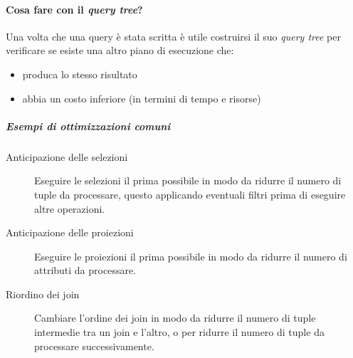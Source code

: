     \paragraph{Cosa fare con il \textit{query tree}?} Una volta che una query è stata scritta è utile costruirsi il suo \textit{query tree} per verificare se esiste una altro piano di esecuzione che: 
        \begin{itemize}
            \item produca lo stesso risultato
            \item abbia un costo inferiore (in termini di tempo e risorse)
        \end{itemize}
        \subparagraph{Esempi di ottimizzazioni comuni}
        \begin{description}
            \item[Anticipazione delle selezioni] Eseguire le selezioni il prima possibile in modo da ridurre il numero di tuple da processare, questo applicando eventuali filtri prima di eseguire altre operazioni.
            \item[Anticipazione delle proiezioni] Eseguire le proiezioni il prima possibile in modo da ridurre il numero di attributi da processare.
            \item[Riordino dei join] Cambiare l'ordine dei join in modo da ridurre il numero di tuple intermedie tra un join e l'altro, o per ridurre il numero di tuple da processare successivamente.
        \end{description}
